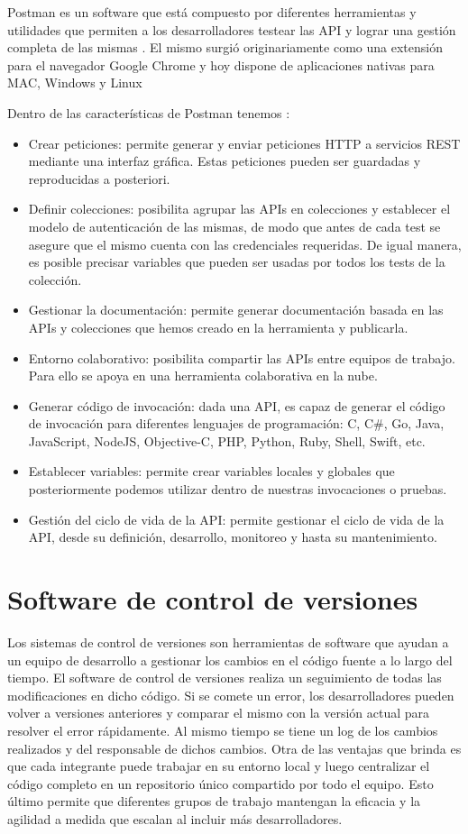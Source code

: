 Postman es un software que está compuesto por diferentes herramientas y utilidades que permiten a los desarrolladores testear las API y lograr una gestión completa de las mismas \citep{WEBSITE:postman1}. El mismo surgió originariamente como una extensión para el navegador Google Chrome y hoy dispone de aplicaciones nativas para MAC, Windows y Linux

Dentro de las características de Postman tenemos \citep{WEBSITE:postman2}: 
\begin{itemize}
\item Crear peticiones: permite generar y enviar peticiones HTTP a servicios REST mediante una interfaz gráfica. Estas peticiones pueden ser guardadas y reproducidas a posteriori.
\item Definir colecciones: posibilita agrupar las APIs en colecciones y establecer el modelo de autenticación de las mismas, de modo que antes de cada test se asegure que el mismo cuenta con las credenciales requeridas. De igual manera, es posible precisar variables que pueden ser usadas por todos los tests de la colección.
\item Gestionar la documentación: permite generar documentación basada en las APIs y colecciones que hemos creado en la herramienta y publicarla.
\item Entorno colaborativo: posibilita compartir las APIs entre equipos de trabajo. Para ello se apoya en una herramienta colaborativa en la nube.
\item Generar código de invocación: dada una API, es capaz de generar el código de invocación para diferentes lenguajes de programación: C, C\#, Go, Java, JavaScript, NodeJS, Objective-C, PHP, Python, Ruby, Shell, Swift, etc.
\item Establecer variables: permite crear variables locales y globales que posteriormente podemos utilizar dentro de nuestras invocaciones o pruebas.
\item Gestión del ciclo de vida de la API: permite gestionar el ciclo de vida de la API, desde su definición, desarrollo, monitoreo y hasta su mantenimiento.
\end{itemize}

\section{Software de control de versiones}

Los sistemas de control de versiones son herramientas de software que ayudan a un equipo de desarrollo a gestionar los cambios en el código fuente a lo largo del tiempo. El software de control de versiones realiza un seguimiento de todas las modificaciones en dicho código. Si se comete un error, los desarrolladores pueden volver a versiones anteriores y comparar el mismo con la versión actual para resolver el error rápidamente. Al mismo tiempo se tiene un log de los cambios realizados y del responsable de dichos cambios. Otra de las ventajas que brinda es que cada integrante puede trabajar en su entorno local y luego centralizar el código completo en un repositorio único compartido por todo el equipo. Esto último permite que diferentes grupos de trabajo mantengan la eficacia y la agilidad a medida que escalan al incluir más desarrolladores.

